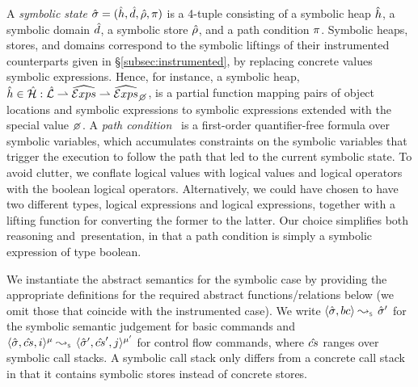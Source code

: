 A \emph{symbolic state} $\hat{\sigma} = (\hat{h}, \hat{d}, \hat\rho, \pi)$ is a 4-tuple consisting of a 
symbolic heap $\hat{h}$, a symbolic domain $\hat{d}$, a symbolic store $\hat\rho$, and a path condition $\pi$. 
Symbolic heaps, stores, and domains correspond to the symbolic liftings of their instrumented 
counterparts given in \S\ref{subsec:instrumented}, by replacing concrete values symbolic expressions. 
Hence, for instance, a symbolic heap, $\sheap \in \sheaps : \slocs \partialmap \sexprs \partialmap \setext{\sexprs}{\none}$,
is a partial function mapping pairs of object locations and symbolic expressions to symbolic expressions
extended with the special value $\none$. 
A \emph{path condition}~\cite{symb:exec:survey} is a first-order quantifier-free formula over symbolic variables, 
which accumulates constraints on the symbolic variables that trigger 
the execution to follow the path that led to the current symbolic state.
To avoid clutter, we conflate logical values with \jsil logical values and \jsil logical 
operators with the boolean logical operators. Alternatively, we could have chosen to 
have two different types, \jsil logical expressions and logical expressions, together with a lifting 
function for converting the former to the latter. Our choice simplifies both reasoning 
and~presentation, in that a path condition is simply a \jsil symbolic expression of type boolean. 

We instantiate the abstract semantics for the symbolic case by providing the appropriate definitions 
for the required abstract functions/relations below (we omit those that coincide with the instrumented case). 
We write $\absbsemrule{\sstate, \bcmd}{\sstate'}{\symbolic}$ for the symbolic semantic 
judgement for basic commands and $\abssemrule{\sstate, \scs, i}{\sstate', \scs', j}{\mode}{\mode'}{\symbolic}$ 
for control flow commands, where $\hat{cs}$ ranges over symbolic call stacks. 
A symbolic call stack only differs from a concrete call stack in that it contains 
symbolic stores instead of concrete stores.


